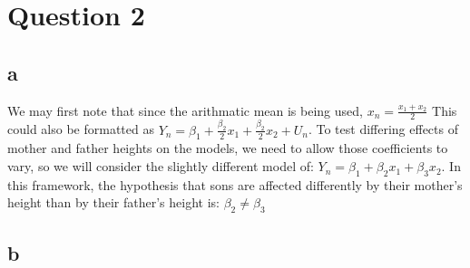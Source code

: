 \documentclass[10pt]{paper}\usepackage[]{graphicx}\usepackage[]{color}
\begin{document}
\section*{Question 2}

\subsection*{a}

We may first note that since the arithmatic mean is being used, $x_n =
\frac{x_1+x_2}{2}$ This could also be formatted as $Y_n = \beta_1 + \frac{\beta_2}{2}x_1 + \frac{\beta_2}{2} x_2
+ U_n$. To test differing effects of mother and father heights on the models, we
need to allow those coefficients to vary, so we will consider the slightly
different model of: $Y_n = \beta_1 + \beta_2 x_1 + \beta_3 x_2$. In this framework, the
hypothesis that sons are affected differently by their mother's height than by
their father's height is: $\beta_2 \neq \beta_3$

\subsection*{b}
\end{document}
